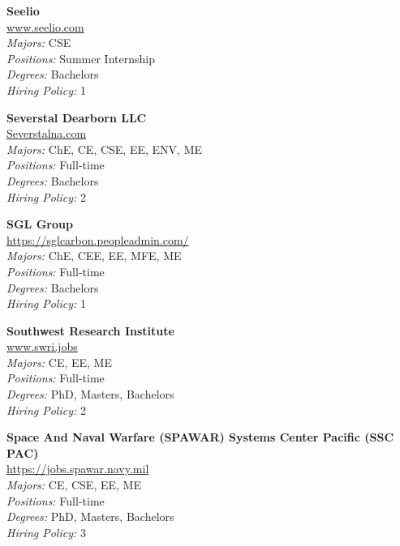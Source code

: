 \documentclass{article}
\begin{document}
\begin{center}
\begin{multicols}{3}
\begin{minipage}{.9\columnwidth}{\Large\bf Seelio }\\
	\url{www.seelio.com}\\
	\emph{Majors:} CSE\\
	\emph{Positions:} Summer Internship\\
	\emph{Degrees:} Bachelors\\
	\emph{Hiring Policy:} 1\\
\end{minipage}
 
\begin{minipage}{.9\columnwidth}{\Large\bf Severstal Dearborn LLC }\\
	\url{Severstalna.com}\\
	\emph{Majors:} ChE, CE, CSE, EE, ENV, ME\\
	\emph{Positions:} Full-time\\
	\emph{Degrees:} Bachelors\\
	\emph{Hiring Policy:} 2\\
\end{minipage}
 
\begin{minipage}{.9\columnwidth}{\Large\bf SGL Group }\\
	\url{https://sglcarbon.peopleadmin.com/}\\
	\emph{Majors:} ChE, CEE, EE, MFE, ME\\
	\emph{Positions:} Full-time\\
	\emph{Degrees:} Bachelors\\
	\emph{Hiring Policy:} 1\\
\end{minipage}
 
\begin{minipage}{.9\columnwidth}{\Large\bf Southwest Research Institute }\\
	\url{www.swri.jobs}\\
	\emph{Majors:} CE, EE, ME\\
	\emph{Positions:} Full-time\\
	\emph{Degrees:} PhD, Masters, Bachelors\\
	\emph{Hiring Policy:} 2\\
\end{minipage}
 
\begin{minipage}{.9\columnwidth}{\Large\bf Space And Naval Warfare (SPAWAR) Systems Center Pacific (SSC PAC) }\\
	\url{https://jobs.spawar.navy.mil}\\
	\emph{Majors:} CE, CSE, EE, ME\\
	\emph{Positions:} Full-time\\
	\emph{Degrees:} PhD, Masters, Bachelors\\
	\emph{Hiring Policy:} 3\\
\end{minipage}
 

\end{multicols}
\end{center}
\end{document}
